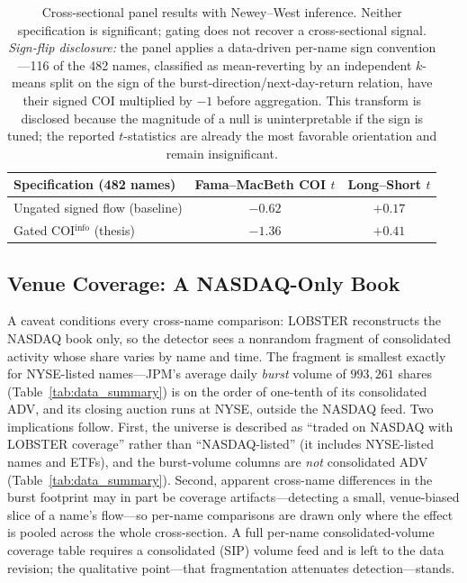 \documentclass[11pt]{article}
\begin{document}
\begin{table}[htbp]
\centering
\begin{tabular}{lcc}
\toprule
\textbf{Specification (482 names)} & \textbf{Fama--MacBeth COI $t$} & \textbf{Long--Short $t$} \\
\midrule
Ungated signed flow (baseline) & $-0.62$ & $+0.17$ \\
Gated COI$^{\text{info}}$ (thesis) & $-1.36$ & $+0.41$ \\
\bottomrule
\end{tabular}
\caption{Cross-sectional panel results with Newey--West inference. Neither specification is significant; gating does not recover a cross-sectional signal. \emph{Sign-flip disclosure:} the panel applies a data-driven per-name sign convention---116 of the 482 names, classified as mean-reverting by an independent $k$-means split on the sign of the burst-direction/next-day-return relation, have their signed COI multiplied by $-1$ before aggregation. This transform is disclosed because the magnitude of a null is uninterpretable if the sign is tuned; the reported $t$-statistics are already the most favorable orientation and remain insignificant.}
\label{tab:coi_panel}
\end{table}

\subsection{Venue Coverage: A NASDAQ-Only Book}
\label{sec:venue}
A caveat conditions every cross-name comparison: LOBSTER reconstructs the NASDAQ book only, so the detector sees a nonrandom fragment of consolidated activity whose share varies by name and time. The fragment is smallest exactly for NYSE-listed names---JPM's average daily \emph{burst} volume of $993{,}261$ shares (Table~\ref{tab:data_summary}) is on the order of one-tenth of its consolidated ADV, and its closing auction runs at NYSE, outside the NASDAQ feed. Two implications follow. First, the universe is described as ``traded on NASDAQ with LOBSTER coverage'' rather than ``NASDAQ-listed'' (it includes NYSE-listed names and ETFs), and the burst-volume columns are \emph{not} consolidated ADV (Table~\ref{tab:data_summary}). Second, apparent cross-name differences in the burst footprint may in part be coverage artifacts---detecting a small, venue-biased slice of a name's flow---so per-name comparisons are drawn only where the effect is pooled across the whole cross-section. A full per-name consolidated-volume coverage table requires a consolidated (SIP) volume feed and is left to the data revision; the qualitative point---that fragmentation attenuates detection---stands.
\end{document}
